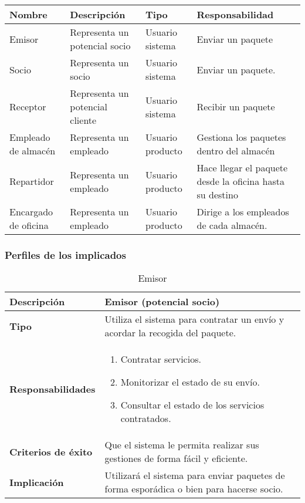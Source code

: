 \documentclass[12pt,spanish]{article}
\begin{document}
\begin{table}[H]
\begin{center}
\begin{tabular}{|p{3cm}|p{4cm}|p{3cm}|p{4cm}|}
\hline
\textbf{Nombre} & \textbf{Descripción} & \textbf{Tipo} & \textbf{Responsabilidad} \\
\hline
Emisor & Representa un potencial socio & Usuario sistema & Enviar un paquete \\
\hline
Socio & Representa un socio & Usuario sistema & Enviar un paquete. \\
\hline
Receptor & Representa un potencial cliente & Usuario sistema & Recibir un paquete \\
\hline
Empleado de almacén & Representa un empleado & Usuario producto & Gestiona los paquetes dentro del almacén \\
\hline
Repartidor & Representa un empleado & Usuario producto & Hace llegar el paquete desde la oficina hasta su destino \\
\hline
Encargado de oficina & Representa un empleado & Usuario producto & Dirige a los empleados de cada almacén.  \\
\hline
\end{tabular}
\end{center}
\end{table}

\subsubsection{Perfiles de los implicados}
\begin{table}[H]
\begin{center}
\begin{tabular}{|l|m{10cm}|}
\hline
\textbf{Descripción} & Emisor (potencial socio) \\
\hline
\textbf{Tipo} & Utiliza el sistema para contratar un envío y acordar la recogida del paquete. \\
\hline
\textbf{Responsabilidades} & 
\begin{minipage}{5in}
    \vskip 1pt
    \begin{enumerate}
   		\item Contratar servicios.
     	\item Monitorizar el estado de su envío.
  		\item Consultar el estado de los servicios contratados.
   \end{enumerate}
   \vskip 1pt
 \end{minipage}\\ 
\hline
\textbf{Criterios de éxito} & Que el sistema le permita realizar sus gestiones de forma fácil y eficiente.\\
\hline
\textbf{Implicación} & Utilizará el sistema para enviar paquetes de forma esporádica o bien para hacerse socio. \\
\hline
\end{tabular}
\caption{Emisor}
\end{center}
\end{table}
\end{document}
